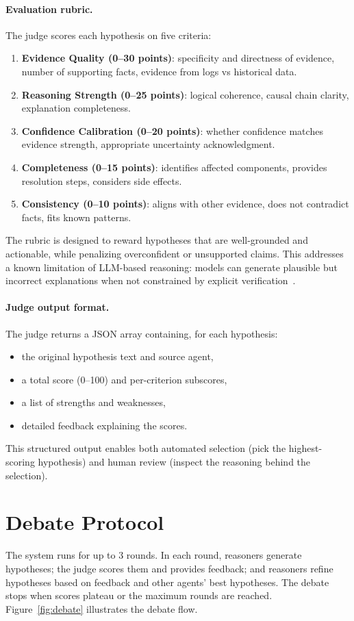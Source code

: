 \paragraph{Evaluation rubric.}
The judge scores each hypothesis on five criteria:
\begin{enumerate}
  \item \textbf{Evidence Quality (0--30 points)}: specificity and directness of evidence, number
        of supporting facts, evidence from logs vs historical data.
  \item \textbf{Reasoning Strength (0--25 points)}: logical coherence, causal chain clarity,
        explanation completeness.
  \item \textbf{Confidence Calibration (0--20 points)}: whether confidence matches evidence
        strength, appropriate uncertainty acknowledgment.
  \item \textbf{Completeness (0--15 points)}: identifies affected components, provides resolution
        steps, considers side effects.
  \item \textbf{Consistency (0--10 points)}: aligns with other evidence, does not contradict
        facts, fits known patterns.
\end{enumerate}
The rubric is designed to reward hypotheses that are well-grounded and actionable, while penalizing
overconfident or unsupported claims. This addresses a known limitation of LLM-based reasoning:
models can generate plausible but incorrect explanations when not constrained by explicit
verification~\cite{du2023improvingfactualityreasoninglanguage}.

\paragraph{Judge output format.}
The judge returns a JSON array containing, for each hypothesis:
\begin{itemize}
  \item the original hypothesis text and source agent,
  \item a total score (0--100) and per-criterion subscores,
  \item a list of strengths and weaknesses,
  \item detailed feedback explaining the scores.
\end{itemize}
This structured output enables both automated selection (pick the highest-scoring hypothesis) and
human review (inspect the reasoning behind the selection).

\section{Debate Protocol}
The system runs for up to 3 rounds. In each round, reasoners generate hypotheses; the judge scores
them and provides feedback; and reasoners refine hypotheses based on feedback and other agents'
best hypotheses. The debate stops when scores plateau or the maximum rounds are reached.
Figure~\ref{fig:debate} illustrates the debate flow.

